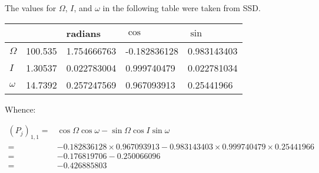 \documentclass[]{article}
\begin{document}
The values for $\Omega$, $I$, and $\omega$ in the following table were taken from SSD.
\begin{center}
	\begin{tabular}{|l|l|l|l|l|}
		\hline
		&&	radians&$\cos$&$\sin$\\ \hline
		$\Omega$&100.535\degree	&1.754666763&	-0.182836128&	0.983143403\\ \hline
		$I$&1.30537\degree&	0.022783004&	0.999740479&	0.022781034\\ \hline
		$\omega$&14.7392\degree&	0.257247569&	0.967093913&	0.25441966\\ \hline
	\end{tabular}
\end{center}

Whence:

\begin{align*}
(P_j)_{1,1} =& \cos \Omega \cos \omega - \sin \Omega \cos I \sin \omega \\
=& -0.182836128 \times 	0.967093913 - 0.983143403 \times 0.999740479 \times 	0.25441966\\
=& -0.176819706 - 0.250066096\\
=& -0.426885803
\end{align*}
\end{document}
